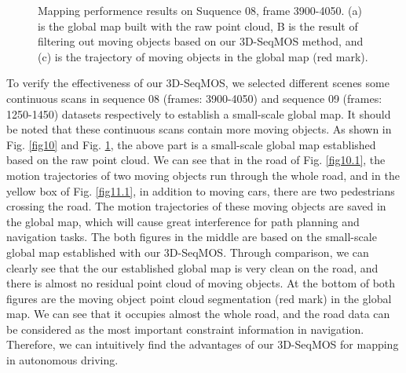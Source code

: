\documentclass[lettersize,journal]{IEEEtran}
\begin{document}
\begin{figure}[h]
\begin{center}
\caption{Mapping performence results on Suquence 08, frame 3900-4050. (a) is the global map built with the raw point cloud, B is the result of filtering out moving objects based on our 3D-SeqMOS method, and (c) is the trajectory of moving objects in the global map (red mark).}
\label{fig11}
\end{center}
\end{figure}

To verify the effectiveness of our 3D-SeqMOS, we selected different scenes some continuous scans in sequence 08 (frames: 3900-4050) and sequence 09 (frames: 1250-1450) datasets respectively to establish a small-scale global map. It should be noted that these continuous scans contain more moving objects. As shown in Fig. \ref{fig10} and Fig. \ref{fig11}, the above part is a small-scale global map established based on the raw point cloud. We can see that in the road of Fig. \ref{fig10.1}, the motion trajectories of two moving objects run through the whole road, and in the yellow box of Fig. \ref{fig11.1}, in addition to moving cars, there are two pedestrians crossing the road. The motion trajectories of these moving objects are saved in the global map, which will cause great interference for path planning and navigation tasks. The both figures in the middle are based on the small-scale global map established with our 3D-SeqMOS. Through comparison, we can clearly see that the our established global map is very clean on the road, and there is almost no residual point cloud of moving objects. At the bottom of both figures are the moving object point cloud segmentation (red mark) in the global map. We can see that it occupies almost the whole road, and the road data can be considered as the most important constraint information in navigation. Therefore, we can intuitively find the advantages of our 3D-SeqMOS for mapping in autonomous driving.
\end{document}
